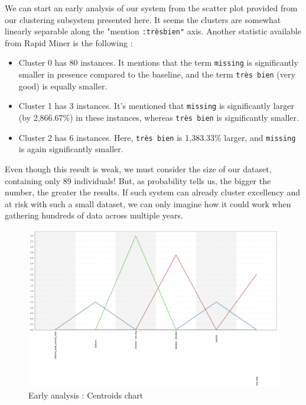 \documentclass[../main.tex]{subfiles}
\begin{document}
We can start an early analysis of our system from the scatter plot provided from our clustering subsystem presented here. It seems the clusters are somewhat linearly separable along the "mention \verb|:trèsbien"| axis.  Another statistic available from Rapid Miner is the following : 
\begin{itemize}
    \item Cluster 0 has 80 instances. It mentions that the term \verb|missing| is significantly smaller in presence compared to the baseline, and the term \verb|très bien| (very good) is equally smaller.
    \item Cluster 1 has 3 instances. It's mentioned that \verb|missing| is significantly larger (by 2,866.67\%) in these instances, whereas \verb|très bien| is significantly smaller.
    \item Cluster 2 has 6 instances. Here, \verb|très bien| is 1,383.33\% larger, and \verb|missing| is again significantly smaller.
\end{itemize}

Even though this result is weak, we must consider the size of our dataset, containing  only 89 individuals! But, as probability tells us, the bigger the number, the greater the results. If such system can already cluster excellency and at risk with such a small dataset, we can only imagine how it could work when gathering hundreds of data across multiple years.

\begin{figure}[H] 
    \includegraphics[width=1\linewidth]{res/graph/data_analysis/imp v1/centroid_charts.png}
    \caption{Early analysis : Centroids chart}
    \label{fig:earlyanalysis_centroidchart_impv1}
\end{figure}
\end{document}
